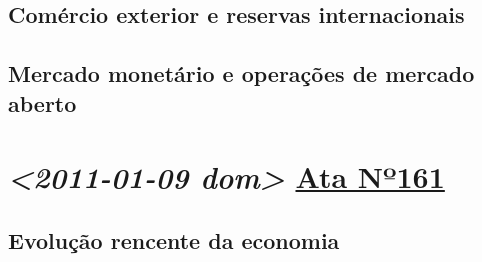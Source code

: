 \documentclass[11pt]{article}
\begin{document}
\subsection*{Comércio exterior e reservas internacionais}
\label{sec:org47f3080}
\subsection*{Mercado monetário e operações de mercado aberto}
\label{sec:org5d7c6e3}
\section*{\textit{<2011-01-09 dom> } \href{https://www.bcb.gov.br/publicacoes/atascopom/31082011}{Ata Nº161}}
\label{sec:org79bdd95}
\subsection*{Evolução rencente da economia}
\label{sec:orgcf6c0ed}
\end{document}
